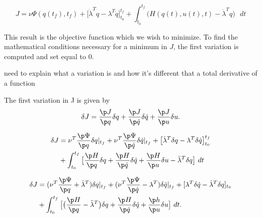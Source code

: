 \begin{equation}
    J = \nu \Psi ( q(t_f),t_f )  + \big[ \dot \lambda^T q - \lambda^T \dot q\big]_{t_0}^{t_f} + \int_{t_0}^{t_f}  \big( H(q(t),u(t),t) - \ddot \lambda^T q \big) \text{  } dt
\end{equation}


This result is the objective function which we wish to minimize. To find the mathematical conditions necessary for a minimum in $J$, the first variation is computed and set equal to 0.


{\color{red} need to explain what a variation is and how it's different that a total derivative of a function }

The first variation in J is given by\\

\begin{equation}
    \delta  J = \frac{\p J}{\p q} \delta q + \frac{\p J}{\p \dot q} \delta \dot q   +  \frac{\p J}{\p u} \delta u.
\end{equation}


\begin{equation}
\begin{split}
    \delta  J &= \nu^T \frac{\p \Psi}{\p q}\delta q |_{t_f}
                 + \nu^T \frac{\p \Psi}{\p \dot q}\delta \dot q |_{t_f}
                 + \big[ \dot \lambda^T \delta q - \lambda^T  \delta \dot q\big]_{t_0}^{t_f}\\
               &+ \int_{t_0}^{t_f}  \big[ \frac{\p H}{\p q}\delta q +
                                           \frac{\p H}{\p \dot q}\delta \dot q 
                                           + \frac{\p H}{\p u}\delta u 
                                           - \ddot \lambda^T  \delta q  \big]   \text{  } dt\\
\end{split}    
\end{equation}
 
\begin{equation}
\begin{split}
    \delta J &= (\nu^T\frac{\p \Psi}{\p q} + \dot \lambda^T) \delta q |_{t_f}
                 + (\nu^T\frac{\p \Psi}{\p \dot q} - \lambda^T) \delta \dot q |_{t_f}
                 +  [ \lambda^T  \delta \dot q - \dot \lambda^T \delta q]_{t_0}\\
              & + \int_{t_0}^{t_f} \big[ \big( \frac{\p H}{\p q} - \ddot \lambda^T \big) \delta q
                                              + \frac{\p H}{\p \dot q} \delta \dot q +  \frac{\p h}{\p u} \delta u \big] \text{  } dt.\\
\end{split}
\end{equation}


